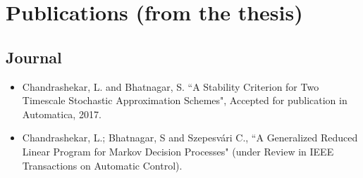 \documentclass[line,margin]{res}
\begin{document}
\begin{resume}
\begin{itemize}
\end{itemize}
\begin{comment}
Solving MDPs typically involves computing the optimal value function and the optimal policy. However, most MDPs arising in practice have a large number of states and it is difficult to compute the optimal value function/policy. Approximate Dynamic Programming deal MDPs with large number of states by computing an approximate value function and a sub-optimal policy. The most widely used approach by ADP methods is linear function approximation wherein the value function is restricted to a subspace spanned by a set of basis functions.\par
Approximate Linear Programming (ALP) method has guaranteed performance for the sub-optimal policy it computes. A significant shortcoming of the ALP is that the number of constraints are large in the case MDPs with large number of states. In the thesis, we introduce the Generalized Reduced Linear Program 
\end{comment}
\section{Publications (from the thesis)}
\subsection{Journal}
\begin{itemize}
\item Chandrashekar, L. and  Bhatnagar, S. ``A Stability Criterion for Two Timescale Stochastic Approximation Schemes", Accepted for publication in Automatica, 2017.
\item Chandrashekar, L.;  Bhatnagar, S and Szepesv\'{a}ri C., ``A Generalized Reduced Linear Program for Markov Decision Processes" (under Review in IEEE Transactions on Automatic Control).
\end{itemize}

\end{resume}
\end{document}
